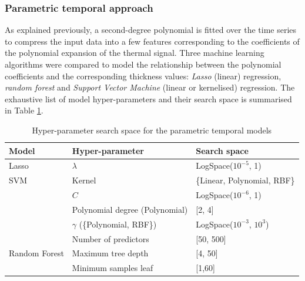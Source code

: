 \subsubsection{Parametric temporal approach}

As explained previously, a second-degree polynomial is fitted over the time series to compress the input data into a few features corresponding to the coefficients of the polynomial expansion of the thermal signal. Three machine learning algorithms were compared to model the relationship between the polynomial coefficients and the corresponding thickness values: \textit{Lasso} (linear) regression, \textit{random forest} and \textit{Support Vector Machine} (linear or kernelised) regression. 
The exhaustive list of model hyper-parameters and their search space is summarised in Table \ref{tab:Parametric Temporal_search_space}.

\begin{table}
\centering
\caption{Hyper-parameter search space for the parametric temporal models}
\label{tab:Parametric Temporal_search_space}
\begin{tabular}{lll} 
\toprule
\textbf{Model}                            & \textbf{Hyper-parameter} & \textbf{Search space}                          \\ 
\midrule
Lasso                                     & $\lambda$                & LogSpace($10^{-5}$, 1)                          \\ 
\midrule
SVM  & Kernel                   & \{Linear, Polynomial, RBF\}  \\ 
\cline{2-3}
                                          & $C$                        & LogSpace($10^{-6}$, 1)                          \\ 
\cline{2-3}
                                          & Polynomial degree (Polynomial) & [2, 4] \\
\cline{2-3}
                                          & $\gamma$ (\{Polynomial, RBF\}) & LogSpace($10^{-3}$, $10^{3}$) \\
                                          
\midrule
\multirow{3}{*}{Random Forest}  & Number of predictors     & [50, 500]                       \\ 
\cline{2-3}
                                          & Maximum tree depth       & [4, 50]                           \\ 
\cline{2-3}
                                          & Minimum samples leaf     & [1,60]                           \\
\bottomrule
\end{tabular}
\end{table}

